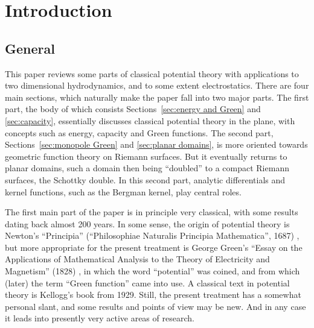 \documentclass[reqno,12pt]{article}
\theoremstyle{plain}
\theoremstyle{definition}
\numberwithin{equation}{section}
\numberwithin{figure}{section}
\begin{document}
 






\section{Introduction}

\subsection{General}

This paper reviews some parts of classical potential theory with applications to 
two dimensional hydrodynamics, and to some extent electrostatics. There are four main sections,
which naturally make the paper fall into two major parts. The first part, the body of which consists Sections~\ref{sec:energy and Green}
and \ref{sec:capacity}, essentially discusses classical potential theory in the plane, with concepts such as energy, capacity
and Green functions. The second part, Sections~\ref{sec:monopole Green} and \ref{sec:planar domains},
is more oriented towards geometric function theory on Riemann surfaces. But it eventually returns to  planar
domains, such a domain then being ``doubled'' to a compact Riemann surfaces, the Schottky double. 
In this second part, analytic differentials and kernel functions, such as the Bergman kernel, play central roles.

The first main part of the paper is in principle very classical, with some results dating back almost 200 years.
In some sense, the origin of potential theory is Newton's ``Principia''
(``Philosophiae Naturalis Principia Mathematica'', 1687) 
\cite{Newton-1687}, but more appropriate for the present treatment is George Green's   ``Essay on the Applications of Mathematical Analysis
to the Theory of Electricity and Magnetism'' (1828) \cite{Green-1828},
in which the word ``potential'' was coined, and from which  (later) the term ``Green function'' came into use.
A classical text in potential theory is Kellogg's book \cite{Kellogg-1967} from 1929.
Still, the present treatment has a somewhat personal slant, and some results and points of view may be new.
And in any case it leads into presently very active areas of research.
\end{document}
